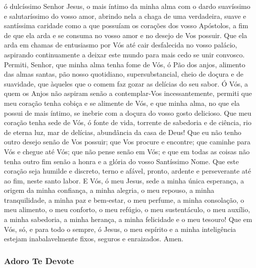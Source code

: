 \begin{paracol}{2}
{ ó dulcíssimo Senhor Jesus, o mais íntimo da minha alma com o dardo suavíssimo e salutaríssimo do vosso amor, abrindo nela a chaga de uma verdadeira, suave e santíssima caridade como a que possuíam os corações dos vosso Apóstolos, a fim de que ela arda e se consuma no vosso amor e no desejo de Vos possuir. Que ela arda em chamas de entusiasmo por Vós até cair desfalecida no vosso palácio, aspirando continuamente a deixar este mundo para mais cedo se unir convosco. Permiti, Senhor, que minha alma tenha fome de Vós, ó Pão dos anjos, alimento das almas santas, pão nosso quotidiano, supersubstancial, cheio de doçura e de suavidade, que àqueles que o comem faz gozar as delícias do seu sabor. Ó Vós, a quem os Anjos não aspiram senão a contemplar-Vos incessantemente, permiti que meu coração tenha cobiça e se alimente de Vós, e que minha alma, no que ela possui de mais íntimo, se inebrie com a doçura do vosso gosto delicioso. Que meu coração tenha sede de Vós, ó fonte de vida, torrente de sabedoria e de ciência, rio de eterna luz, mar de delícias, abundância da casa de Deus! Que eu não tenho outro desejo senão de Vos possuir; que Vos procure e encontre; que caminhe para Vós e chegue até Vós; que não pense senão em Vós; e que em todas as coisas não tenha outro fim senão a honra e a glória do vosso Santíssimo Nome. Que este coração seja humilde e discreto, terno e afável, pronto, ardente e perseverante até ao fim, neste santo labor. E Vós, ó meu Jesus, sede a minha única esperança, a origem da minha confiança, a minha alegria, o meu repouso, a minha tranquilidade, a minha paz e bem-estar, o meu perfume, a minha consolação, o meu alimento, o meu conforto, o meu refúgio, o meu sustentáculo, o meu auxílio, a minha sabedoria, a minha herança, a minha felicidade e o meu tesouro! Que em Vós, só, e para todo o sempre, ó Jesus, o meu espírito e a minha inteligência estejam inabalavelmente fixos, seguros e enraizados. Amen.
}\end{paracol}

\subsubsection{Adoro Te Devote}



